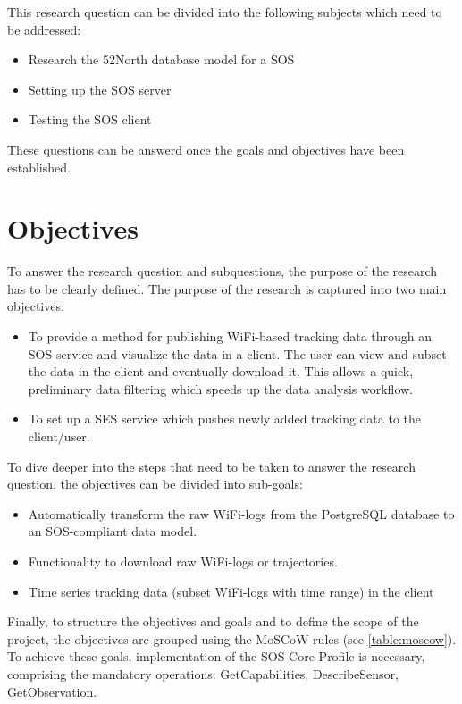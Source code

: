 This research question can be divided into the following subjects which need to be addressed:
\begin{itemize}
\item Research the 52North database model for a SOS
\item Setting up the SOS server
\item Testing the SOS client
\end{itemize}

These questions can be answerd once the goals and objectives have been established.

\section{Objectives}
To answer the research question and subquestions, the purpose of the research has to be clearly defined. The purpose of the research is captured into two main objectives:
\begin{itemize}
\item To provide a method for publishing WiFi-based tracking data through an SOS service and visualize the data in a client. The user can view and subset the data in the client and eventually download it. This allows a quick, preliminary data filtering which speeds up the data analysis workflow.
\item To set up a SES service which pushes newly added tracking data to the client/user.
\end{itemize}
To dive deeper into the steps that need to be taken to answer the research question, the objectives can be divided into sub-goals:\\
\begin{itemize}
\item Automatically transform the raw WiFi-logs from the PostgreSQL database to an SOS-compliant data model.
\item Functionality to download raw WiFi-logs or trajectories.
\item Time series tracking data (subset WiFi-logs with time range) in the client
\end{itemize}
Finally, to structure the objectives and goals and to define the scope of the project, the objectives are grouped using the MoSCoW rules (see \autoref{table:moscow}). To achieve these goals, implementation of the SOS Core Profile is necessary, comprising the mandatory operations: GetCapabilities, DescribeSensor, GetObservation.\\
